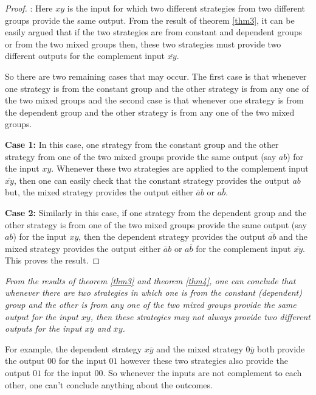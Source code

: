 \documentclass[]{svjour3}
\begin{document}
\begin{proof}
	: Here $xy$ is the input for which two different strategies from two different groups provide the same output. From the result of theorem \ref{thm3}, it can be easily argued that if the two strategies are from constant and dependent groups or from the two mixed groups then, these two strategies must provide two different outputs for the complement input $\overline{xy}$. 
	
	So there are two remaining cases that may occur. The first case is that whenever one strategy is from the constant group and the other strategy is from any one of the two mixed groups and the second case is that whenever one strategy is from the dependent group and the other strategy is from any one of the two mixed groups.
	
	{\bf Case 1:} In this case, one strategy from the constant group and the other strategy from one of the two mixed groups provide the same output (say $ab$) for the input $xy$. Whenever these two strategies are applied to the complement input $\overline{xy}$, then one can easily check that the constant strategy provides the output $ab$ but, the mixed strategy provides the output either $\overline{a}b$ or $a\overline{b}$.
	
	{\bf Case 2:} Similarly in this case, if one strategy from the dependent group and the other strategy is from one of the two mixed groups provide the same output (say $ab$) for the input $xy$, then the dependent strategy provides the output $\overline{ab}$ and the mixed strategy provides the output either $\overline{a}b$ or $a\overline{b}$ for the complement input $\overline{xy}$. This proves the result.
\end{proof}
\noindent

\begin{corollary}
	\label{cor1}
	{\it From the results of theorem \ref{thm3} and theorem \ref{thm4}, one can conclude that whenever there are two strategies in which one is from the constant (dependent) group and the other is from any one of the two mixed groups provide the same output for the input $xy$, then these strategies may not always provide two different outputs for the input $x\overline{y}$ and $\overline{x}y$.}
\end{corollary} 

For example, the dependent strategy $x\overline{y}$ and the mixed strategy $0\overline{y}$ both provide the output $00$ for the input $01$ however these two strategies also provide the output $01$ for the input $00$. So whenever the inputs are not complement to each other, one can't conclude anything about the outcomes. 
\end{document}
